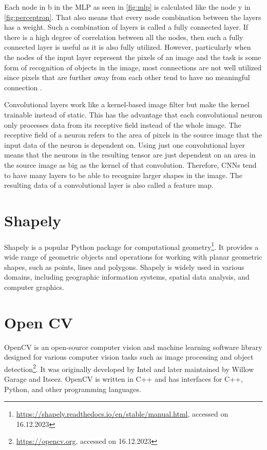 \documentclass[10pt]{book}
\newcommand{\figureref}[1]{\autoref{#1}}
\begin{document}
Each node in b in the \ac{MLP} as seen in \figureref{fig:mlp} is calculated like the node y in \figureref{fig:perceptron}. That also means that every node combination between the layers has a weight. Such a combination of layers is called a fully connected layer. If there is a high degree of correlation between all the nodes, then such a fully connected layer is useful as it is also fully utilized. However, particularly when the nodes of the input layer represent the pixels of an image and the task is some form of recognition of objects in the image, most connections are not well utilized since pixels that are further away from each other tend to have no meaningful connection \cite{aghdam2017guide}.

Convolutional layers work like a kernel-based image filter but make the kernel trainable instead of static. This has the advantage that each convolutional neuron only processes data from its receptive field instead of the whole image. The receptive field of a neuron refers to the area of pixels in the source image that the input data of the neuron is dependent on. Using just one convolutional layer means that the neurons in the resulting tensor are just dependent on an area in the source image as big as the kernel of that convolution. Therefore, \acp{CNN} tend to have many layers to be able to recognize larger shapes in the image. The resulting data of a convolutional layer is also called a feature map. 

\section{Shapely} %

Shapely is a popular Python package for computational geometry\footnote{\url{https://shapely.readthedocs.io/en/stable/manual.html}, accessed on 16.12.2023}. It provides a wide range of geometric objects and operations for working with planar geometric shapes, such as points, lines and polygons. Shapely is widely used in various domains, including geographic information systems, spatial data analysis, and computer graphics.

\section{Open CV}

\ac{OpenCV} is an open-source computer vision and machine learning software library designed for various computer vision tasks such as image processing and object detection\footnote{\url{https://opencv.org}, accessed on 16.12.2023}. It was originally developed by Intel and later maintained by Willow Garage and Itseez. \ac{OpenCV} is written in C++ and has interfaces for C++, Python, and other programming languages.
\end{document}
